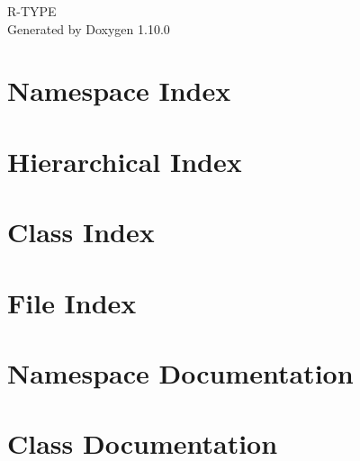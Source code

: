 \documentclass[twoside]{book}
\newcommand{\+}{\discretionary{\mbox{\scriptsize$\hookleftarrow$}}{}{}}
\newcommand{\clearemptydoublepage}{%
    \newpage{\pagestyle{empty}\cleardoublepage}%
  }
\begin{document}
  \raggedbottom
    \hypersetup{pageanchor=false,
                bookmarksnumbered=true,
                pdfencoding=unicode
               }
  \begin{titlepage}
  \vspace*{7cm}
  \begin{center}%
  {\Large R-\/\+TYPE}\\
  \vspace*{1cm}
  {\large Generated by Doxygen 1.10.0}\\
  \end{center}
  \end{titlepage}
  \clearemptydoublepage
  \tableofcontents
  \clearemptydoublepage
  \hypersetup{pageanchor=true}






\chapter{Namespace Index}

\chapter{Hierarchical Index}

\chapter{Class Index}

\chapter{File Index}

\chapter{Namespace Documentation}

\chapter{Class Documentation}
















\end{document}
